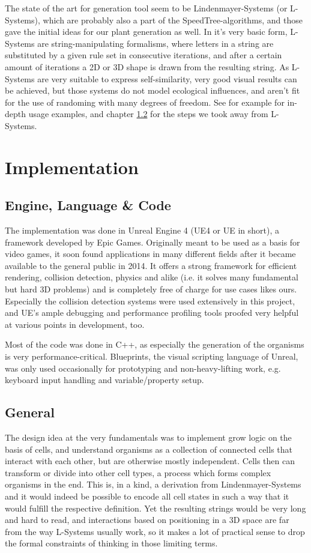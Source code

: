 \documentclass[11pt]{scrartcl}
\begin{document}
The state of the art for generation tool seem to be Lindenmayer-Systems (or L-Systems), which are probably also a part of the SpeedTree-algorithms, and those gave the initial ideas for our plant generation as well. In it's very basic form, L-Systems are string-manipulating formalisms, where letters in a string are substituted by a given rule set in consecutive iterations, and after a certain amount of iterations a 2D or 3D shape is drawn from the resulting string. As L-Systems are very suitable to express self-similarity, very good visual results can be achieved, but those systems do not model ecological influences, and aren't fit for the use of randoming with many degrees of freedom. See for example \cite{ClimbingPlants} for in-depth usage examples, and chapter \ref{cpt:ImplGeneral} for the steps we took away from L-Systems.

\section{Implementation}
\subsection{Engine, Language \& Code}
The implementation was done in Unreal Engine 4 (UE4 or UE in short)\cite{WhatIsUnreal}, a framework developed by Epic Games. Originally meant to be used as a basis for video games, it soon found applications in many different fields after it became available to the general public in 2014. It offers a strong framework for efficient rendering, collision detection, physics and alike (i.e. it solves many fundamental but hard 3D problems) and is completely free of charge for use cases likes ours. Especially the collision detection systems were used extensively in this project, and UE's ample debugging and performance profiling tools proofed very helpful at various points in development, too. 

Most of the code was done in C++, as especially the generation of the organisms is very performance-critical. Blueprints, the visual scripting language of Unreal, was only used occasionally for prototyping and non-heavy-lifting work, e.g. keyboard input handling and variable/property setup.

\subsection{General} \label{cpt:ImplGeneral}
The design idea at the very fundamentals was to implement grow logic on the basis of cells, and understand organisms as a collection of connected cells that interact with each other, but are otherwise mostly independent. Cells then can transform or divide into other cell types, a process which forms complex organisms in the end. This is, in a kind, a derivation from Lindenmayer-Systems and it would indeed be possible to encode all cell states in such a way that it would fulfill the respective definition. Yet the resulting strings would be very long and hard to read, and interactions based on positioning in a 3D space are far from the way L-Systems usually work, so it makes a lot of practical sense to drop the formal constraints of thinking in those limiting terms. 
\end{document}
